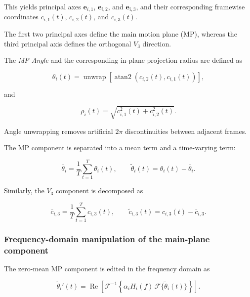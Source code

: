 \documentclass[12pt]{article}
\begin{document}
This yields principal axes
$\mathbf{e}_{i,1}$,
$\mathbf{e}_{i,2}$, and
$\mathbf{e}_{i,3}$,
and their corresponding framewise coordinates
$c_{i,1}(t)$,
$c_{i,2}(t)$, and
$c_{i,3}(t)$.

The first two principal axes define the main motion plane (MP), whereas
the third principal axis defines the orthogonal $V_3$ direction.

The \textit{MP Angle} and the corresponding in-plane projection radius
are defined as

\begin{equation}
\theta_i(t)
=
\operatorname{unwrap}
\left[
\operatorname{atan2}
\left(
c_{i,2}(t),
c_{i,1}(t)
\right)
\right],
\label{eq:sup-theta}
\end{equation}

and

\begin{equation}
\rho_i(t)
=
\sqrt{
c_{i,1}^{2}(t)
+
c_{i,2}^{2}(t)
}.
\label{eq:sup-rho}
\end{equation}

Angle unwrapping removes artificial $2\pi$ discontinuities between
adjacent frames.

The MP component is separated into a mean term and a time-varying term:

\begin{equation}
\bar{\theta}_i
=
\frac{1}{T}
\sum_{t=1}^{T}
\theta_i(t),
\qquad
\tilde{\theta}_i(t)
=
\theta_i(t)
-
\bar{\theta}_i.
\label{eq:sup-mp-components}
\end{equation}

Similarly, the $V_3$ component is decomposed as

\begin{equation}
\bar{c}_{i,3}
=
\frac{1}{T}
\sum_{t=1}^{T}
c_{i,3}(t),
\qquad
\tilde{c}_{i,3}(t)
=
c_{i,3}(t)
-
\bar{c}_{i,3}.
\label{eq:sup-v3-components}
\end{equation}


\subsubsection{Frequency-domain manipulation of the main-plane component}
\label{sup:frequency-manipulation}

The zero-mean MP component is edited in the frequency domain as

\begin{equation}
\tilde{\theta}_i'(t)
=
\operatorname{Re}\!\left[
\mathcal{F}^{-1}
\left\{
\alpha_i H_i(f)\,
\mathcal{F}\{\tilde{\theta}_i(t)\}
\right\}
\right].
\label{eq:sup-spectrum-edit}
\end{equation}
\end{document}
